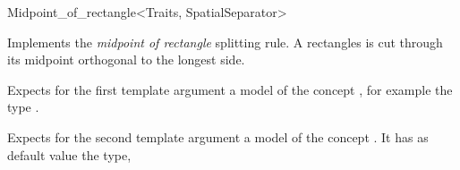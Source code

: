 

\begin{ccRefFunctionObjectClass}{Midpoint_of_rectangle<Traits, SpatialSeparator>}


\ccDefinition
Implements the {\em midpoint of rectangle} splitting rule.
A rectangles is cut through its midpoint orthogonal to the longest side.


\ccParameters

Expects for the first template argument a model of
the concept , for example
the type . 

Expects for the second template argument a model of the concept . It has as default value
the type, 


\ccIsModel



\ccCreation
{}  %


\ccSeeAlso

\\

\end{ccRefFunctionObjectClass}





